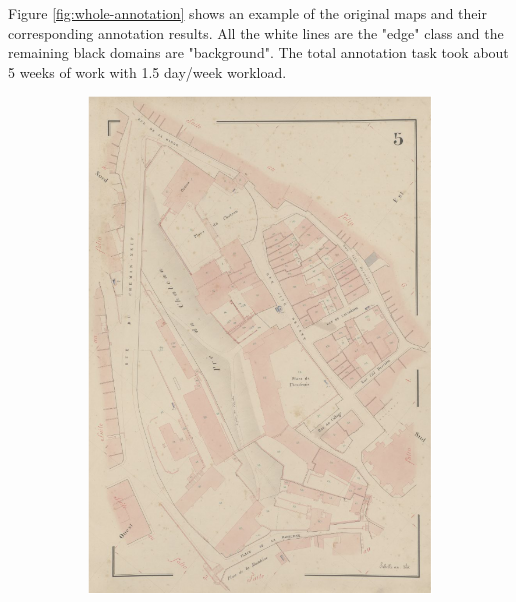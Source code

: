 \documentclass[12pt]{article}
\begin{document}
Figure \ref{fig:whole-annotation} shows an example of the original maps and their corresponding annotation results. All the white lines are the "edge" class and the remaining black domains are "background". The total annotation task took about 5 weeks of work with 1.5 day/week workload.

\begin{figure}[H]
    
	\begin{subfigure}[b]{0.5\textwidth}
	    \centering
		\includegraphics[width=1\linewidth]{images/img1.png}  
		\label{fig:}
	\end{subfigure}
	\begin{subfigure}[b]{.5\textwidth}

\end{subfigure}
\end{figure}
\end{document}
